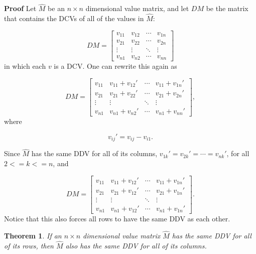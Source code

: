 \documentclass[10pt,letterpaper]{article}
\newtheorem{thm}{Theorem}[section]
\newenvironment{proof}{\noindent\textbf{Proof} }{\qed \newline}
\newcommand{\qed}{\nobreak \ifvmode \relax \else
      \ifdim\lastskip<1.5em \hskip-\lastskip
      \hskip1.5em plus0em minus0.5em \fi \nobreak
      \vrule height0.75em width0.5em depth0.25em\fi}
\numberwithin{equation}{section}
\begin{document}
\begin{proof}Let $\hat M$ be an $n \times n$ dimensional value
  matrix, and let $DM$ be the matrix that contains the DCVs of all
  of the values in $\hat M$:

\[ DM = \left[ \begin{matrix} 
  v_{11} & v_{12} & \cdots & v_{1n} \\
  v_{21} & v_{22} & \cdots & v_{2n} \\
  \vdots & \vdots & \ddots & \vdots \\
  v_{n1} & v_{n2} & \cdots & v_{nn}
\end{matrix} \right] \] in which each $v$ is a DCV.  One can rewrite
this again as

\[ DM = \left[ \begin{matrix} 
  v_{11} & v_{11} + v_{12} \prime & \cdots & v_{11} + v_{1n} \prime \\
  v_{21} & v_{21} + v_{22} \prime & \cdots & v_{21} + v_{2n} \prime \\
  \vdots & \vdots & \ddots & \vdots \\
  v_{n1} & v_{n1} + v_{n2} \prime & \cdots & v_{n1} + v_{nn} \prime
 \end{matrix} \right] , \] where

\[ v_{ij} \prime = v_{ij} - v_{i1} . \]

Since $\hat M$ has the same DDV for all of its columns, $v_{1k}
\prime = v_{2k} \prime = \cdots = v_{nk} \prime$, for all $2 <= k <=
n$, and

\[ DM = \left[ \begin{matrix} 
  v_{11} & v_{11} + v_{12} \prime & \cdots & v_{11} + v_{1n} \prime \\
  v_{21} & v_{21} + v_{12} \prime & \cdots & v_{21} + v_{1n} \prime \\
  \vdots & \vdots & \ddots & \vdots \\
  v_{n1} & v_{n1} + v_{12} \prime & \cdots & v_{n1} + v_{1n} \prime
\end{matrix} \right] . \] Notice that this also forces all rows to
have the same DDV as each other. \end{proof}

\begin{thm} \label{if_same_row_ddvs_then_same_col_ddvs} If an $n
  \times n$ dimensional value matrix $\hat M$ has the same DDV for all
  of its rows, then $\hat M$ also has the same DDV for all of its
  columns.\end{thm}
\end{document}
